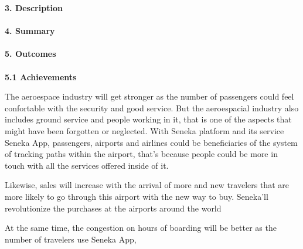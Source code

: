 \documentclass[]{article}
\begin{document}
\Large{\textbf{3. Description}\\}\\


\Large{\textbf{4. Summary}\\}\\

\Large{\textbf{5. Outcomes}\\}\\

\Large{\textbf{5.1 Achievements}\\}

The aeroespace industry will get stronger as the number of passengers could feel confortable with the security and good service. But the aeroespacial industry also includes ground service and people working in it, that is one of the aspects that might have been forgotten or neglected. With Seneka platform and its service Seneka App, passengers, airports and airlines could be beneficiaries of the system of tracking paths within the airport, that's because people could be more in touch with all the services offered inside of it.

Likewise, sales will increase with the arrival of more and new travelers that are more likely to go through this airport with the new way to buy. Seneka'll revolutionize the purchases at the airports around the world

At the same time, the congestion on hours of boarding will be better as the number of travelers use Seneka App, 
\end{document}
